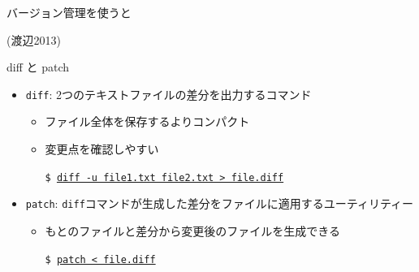 \begin{frame}[t,fragile]{バージョン管理を使うと}
  \vspace*{-1.8em}
  \begin{center}
  \end{center}
  \vspace*{-2em}
  {\footnotesize (渡辺2013)}
\end{frame}

\begin{frame}[t,fragile]{diff と patch}
  \begin{itemize}
    \setlength{\itemsep}{1em}
  \item {\tt diff}: 2つのテキストファイルの差分を出力するコマンド
    \begin{itemize}
    \item ファイル全体を保存するよりコンパクト
    \item 変更点を確認しやすい
      
      {\tt \$ \underline{diff -u file1.txt file2.txt > file.diff}}
    \end{itemize}
  \item {\tt patch}: {\tt diff}コマンドが生成した差分をファイルに適用するユーティリティー
    \begin{itemize}
    \item もとのファイルと差分から変更後のファイルを生成できる

      {\tt \$ \underline{patch < file.diff}}
    \end{itemize}
  \end{itemize}
\end{frame}

